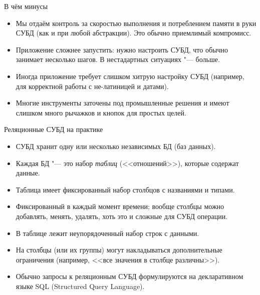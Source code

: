 \begin{frame}{В чём минусы}
	\begin{itemize}
		\item
			Мы отдаём контроль за скоростью выполнения и потреблением памяти в руки СУБД
			(как и при любой абстракции).
			Это обычно приемлимый компромисс.
		\item
			Приложение сложнее запустить: нужно настроить СУБД, что обычно занимает несколько шагов.
			В нестадартных ситуациях "--- больше.
		\item
			Иногда приложение требует слишком хитрую настройку СУБД (например, для корректной работы
			с не-латиницей и датами).
		\item
			Многие инструменты заточены под промышленные решения и имеют слишком много рычажков и кнопок
			для простых целей.
	\end{itemize}
\end{frame}

\begin{frame}{Реляционные СУБД на практике}
	\begin{itemize}
		\item СУБД хранит одну или несколько независимых БД (баз данных).
		\item Каждая БД "--- это набор \textit{таблиц} (<<отношений>>), которые содержат данные.
		\item Таблица имеет фиксированный набор столбцов с названиями и типами.
		\item Фиксированный в каждый момент времени; вообще столбцы можно добавлять, менять, удалять, хоть это и сложные для СУБД операции.
		\item В таблице лежит неупорядоченный набор строк с данными.
		\item На столбцы (или их группы) могут накладываться дополнительные ограничения (например, <<все значения в столбце различны>>).
		\item Обычно запросы к реляционным СУБД формулируются на декларативном языке SQL
			(Structured Query Language).
	\end{itemize}
\end{frame}
